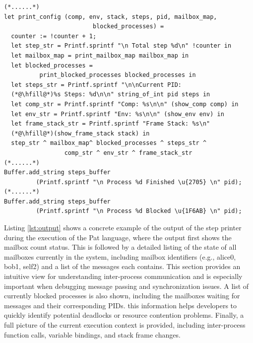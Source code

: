 \documentclass{l4proj}
\begin{document}
\noindent\begin{minipage}{\linewidth}
\lstset{style=Ocamlstyle,}
\begin{lstlisting}[caption={Evaluation Step Printer}, label={lst:Printer}]
(*......*)
let print_config (comp, env, stack, steps, pid, mailbox_map, 
                         blocked_processes) =
  counter := !counter + 1;
  let step_str = Printf.sprintf "\n Total step %d\n" !counter in
  let mailbox_map = print_mailbox_map mailbox_map in
  let blocked_processes = 
          print_blocked_processes blocked_processes in
  let steps_str = Printf.sprintf "\n\nCurrent PID: 
  (*@\hfill@*)%s Steps: %d\n\n" string_of_int pid steps in
  let comp_str = Printf.sprintf "Comp: %s\n\n" (show_comp comp) in
  let env_str = Printf.sprintf "Env: %s\n\n" (show_env env) in
  let frame_stack_str = Printf.sprintf "Frame Stack: %s\n"
  (*@\hfill@*)(show_frame_stack stack) in
  step_str ^ mailbox_map^ blocked_processes ^ steps_str ^
                 comp_str ^ env_str ^ frame_stack_str
(*......*)
Buffer.add_string steps_buffer
         (Printf.sprintf "\n Process %d Finished \u{2705} \n" pid);
(*......*)
Buffer.add_string steps_buffer 
         (Printf.sprintf "\n Process %d Blocked \u{1F6AB} \n" pid);

\end{lstlisting}
\end{minipage}

Listing \ref{lst:output} shows a concrete example of the output of the step printer during the execution of the Pat language, where the output first shows the mailbox count status. This is followed by a detailed listing of the state of all mailboxes currently in the system, including mailbox identifiers (e.g., alice0, bob1, self2) and a list of the messages each contains. This section provides an intuitive view for understanding inter-process communication and is especially important when debugging message passing and synchronization issues. A list of currently blocked processes is also shown, including the mailboxes waiting for messages and their corresponding PIDs. this information helps developers to quickly identify potential deadlocks or resource contention problems. Finally, a full picture of the current execution context is provided, including inter-process function calls, variable bindings, and stack frame changes.
\end{document}
